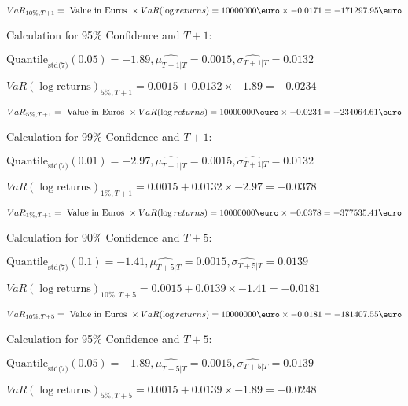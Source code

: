 \indent\indent $VaR_{10\%, T + 1} = \text{ Value in Euros } \times VaR(\log returns) = 10 000 000 \text{\euro} \times-0.0171 = -171297.95 \text{\euro}$\newline




Calculation for 95\% Confidence and $T+1$:

\indent\indent $\text{Quantile}_\text{std(7)}(0.05) = -1.89,\hat{\mu_{T+1|T}} = 0.0015, \hat{\sigma_{T+1|T}} = 0.0132$

\indent\indent $VaR(\log \text{returns})_{5\%, T + 1} = 0.0015 + 0.0132\times-1.89 = -0.0234$

\indent\indent $VaR_{5\%, T + 1} = \text{ Value in Euros } \times VaR(\log returns) = 10 000 000 \text{\euro} \times-0.0234 = -234064.61 \text{\euro}$\newline




Calculation for 99\% Confidence and $T+1$:

\indent\indent $\text{Quantile}_\text{std(7)}(0.01) = -2.97,\hat{\mu_{T+1|T}} = 0.0015, \hat{\sigma_{T+1|T}} = 0.0132$

\indent\indent $VaR(\log \text{returns})_{1\%, T + 1} = 0.0015 + 0.0132\times-2.97 = -0.0378$

\indent\indent $VaR_{1\%, T + 1} = \text{ Value in Euros } \times VaR(\log returns) = 10 000 000 \text{\euro} \times-0.0378 = -377535.41 \text{\euro}$\newline




Calculation for 90\% Confidence and $T+5$:

\indent\indent $\text{Quantile}_\text{std(7)}(0.1) = -1.41,\hat{\mu_{T+5|T}} = 0.0015, \hat{\sigma_{T+5|T}} = 0.0139$

\indent\indent $VaR(\log \text{returns})_{10\%, T + 5} = 0.0015 + 0.0139\times-1.41 = -0.0181$

\indent\indent $VaR_{10\%, T + 5} = \text{ Value in Euros } \times VaR(\log returns) = 10 000 000 \text{\euro} \times-0.0181 = -181407.55 \text{\euro}$\newline




Calculation for 95\% Confidence and $T+5$:

\indent\indent $\text{Quantile}_\text{std(7)}(0.05) = -1.89,\hat{\mu_{T+5|T}} = 0.0015, \hat{\sigma_{T+5|T}} = 0.0139$

\indent\indent $VaR(\log \text{returns})_{5\%, T + 5} = 0.0015 + 0.0139\times-1.89 = -0.0248$

